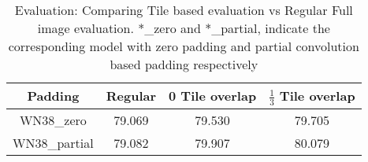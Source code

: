 \documentclass[10pt,twocolumn,letterpaper]{article}
\begin{document}
\begin{table}
\begin{tabular}{c|c|cc}
        Padding & Regular & 0 Tile overlap & $\frac{1}{3}$ Tile overlap\\
        \hline
        WN38\_zero & 79.069 & 79.530 & 79.705 \\
        WN38\_partial & 79.082 & 79.907 & 80.079 \\
    \end{tabular}
    \caption{Evaluation: Comparing Tile based evaluation vs Regular Full image evaluation. *\_zero and *\_partial, indicate  the corresponding model with zero padding and partial convolution based padding respectively}
    \label{tab:eval_overlap}
    \vspace{-.3cm}    
\end{table}%
\end{document}
